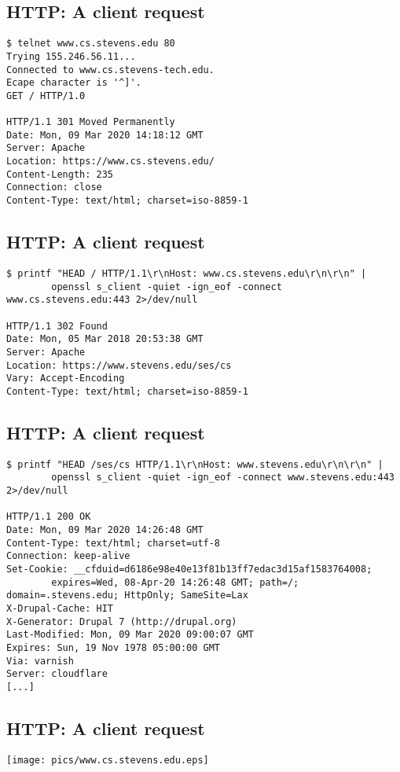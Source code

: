 \documentclass[xga]{xdvislides}
\begin{document}
\subsection{HTTP: A client request}
\smallish
\begin{verbatim}
$ telnet www.cs.stevens.edu 80
Trying 155.246.56.11...
Connected to www.cs.stevens-tech.edu.
Ecape character is '^]'.
GET / HTTP/1.0

HTTP/1.1 301 Moved Permanently
Date: Mon, 09 Mar 2020 14:18:12 GMT
Server: Apache
Location: https://www.cs.stevens.edu/
Content-Length: 235
Connection: close
Content-Type: text/html; charset=iso-8859-1
\end{verbatim}
\Normalsize

\subsection{HTTP: A client request}
\smallish
\begin{verbatim}
$ printf "HEAD / HTTP/1.1\r\nHost: www.cs.stevens.edu\r\n\r\n" |
        openssl s_client -quiet -ign_eof -connect www.cs.stevens.edu:443 2>/dev/null

HTTP/1.1 302 Found
Date: Mon, 05 Mar 2018 20:53:38 GMT
Server: Apache
Location: https://www.stevens.edu/ses/cs
Vary: Accept-Encoding
Content-Type: text/html; charset=iso-8859-1
\end{verbatim}
\Normalsize

\subsection{HTTP: A client request}
\smallish
\begin{verbatim}
$ printf "HEAD /ses/cs HTTP/1.1\r\nHost: www.stevens.edu\r\n\r\n" |
        openssl s_client -quiet -ign_eof -connect www.stevens.edu:443 2>/dev/null 

HTTP/1.1 200 OK
Date: Mon, 09 Mar 2020 14:26:48 GMT
Content-Type: text/html; charset=utf-8
Connection: keep-alive
Set-Cookie: __cfduid=d6186e98e40e13f81b13ff7edac3d15af1583764008;
        expires=Wed, 08-Apr-20 14:26:48 GMT; path=/; domain=.stevens.edu; HttpOnly; SameSite=Lax
X-Drupal-Cache: HIT
X-Generator: Drupal 7 (http://drupal.org)
Last-Modified: Mon, 09 Mar 2020 09:00:07 GMT
Expires: Sun, 19 Nov 1978 05:00:00 GMT
Via: varnish
Server: cloudflare
[...]
\end{verbatim}
\Normalsize

\subsection{HTTP: A client request}
\begin{center}
	\texttt{[image: pics/www.cs.stevens.edu.eps]}
\end{center}
\end{document}
